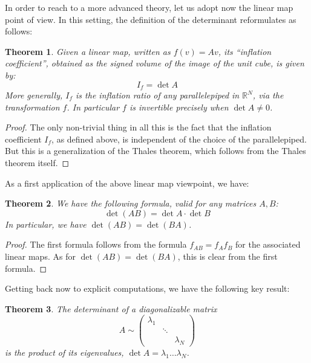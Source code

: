 \documentclass[12pt]{amsbook}
\newtheorem{theorem}{Theorem}[chapter]
\begin{document}
In order to reach to a more advanced theory, let us adopt now the linear map point of view. In this setting, the definition of the determinant reformulates as follows: 


\begin{theorem}
Given a linear map, written as $f(v)=Av$, its ``inflation coefficient'', obtained as the signed volume of the image of the unit cube, is given by:
$$I_f=\det A$$
More generally, $I_f$ is the inflation ratio of any parallelepiped in $\mathbb R^N$, via the transformation $f$. In particular $f$ is invertible precisely when $\det A\neq0$.
\end{theorem}

\begin{proof}
The only non-trivial thing in all this is the fact that the inflation coefficient $I_f$, as defined above, is independent of the choice of the parallelepiped. But this is a generalization of the Thales theorem, which follows from the Thales theorem itself.
\end{proof}

As a first application of the above linear map viewpoint, we have:


\begin{theorem}
We have the following formula, valid for any matrices $A,B$:
$$\det(AB)=\det A\cdot\det B$$
In particular, we have $\det(AB)=\det(BA)$.
\end{theorem}

\begin{proof}
The first formula follows from the formula $f_{AB}=f_Af_B$ for the associated linear maps. As for $\det(AB)=\det(BA)$, this is clear from the first formula.
\end{proof}

Getting back now to explicit computations, we have the following key result:


\begin{theorem}
The determinant of a diagonalizable matrix 
$$A\sim\begin{pmatrix}
\lambda_1\\ 
&\ddots\\
&&\lambda_N\end{pmatrix}$$
is the product of its eigenvalues, $\det A=\lambda_1\ldots\lambda_N$.
\end{theorem}
\end{document}
